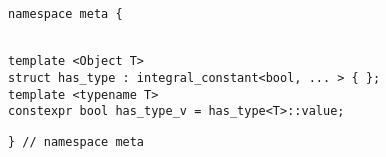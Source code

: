 
\begin{verbatim}
namespace meta {
\end{verbatim}
\begin{verbatim}

template <Object T>
struct has_type : integral_constant<bool, ... > { };
template <typename T>
constexpr bool has_type_v = has_type<T>::value;

\end{verbatim}
\begin{verbatim}
} // namespace meta
\end{verbatim}
